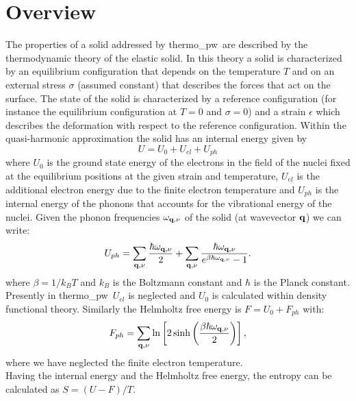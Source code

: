 \documentclass[12pt,a4paper]{article}
\def\tpw{{\sc thermo\_pw}}
\begin{document}
\section{\color{coral}Overview}
The properties of a solid addressed by \tpw\ are described by the thermodynamic
theory of the elastic solid. In this theory a solid is characterized by an
equilibrium configuration that depends on the temperature $T$ and on an
external stress $\sigma$ (assumed constant) that describes the forces 
that act on the surface. The state
of the solid is characterized by a reference configuration 
(for instance the equilibrium configuration at $T=0$ and $\sigma=0$) and 
a strain $\epsilon$ which describes the deformation with respect to the 
reference configuration. 
Within the quasi-harmonic approximation the solid has an internal
energy given by  
\begin{equation}
U=U_0 + U_{el} + U_{ph}
\end{equation}
where $U_0$ is the ground state energy of the electrons in the field 
of the nuclei fixed at the equilibrium positions at the given strain and
temperature, $U_{el}$ is the additional electron energy due to the 
finite electron temperature and $U_{ph}$ is the internal energy of the 
phonons that accounts for the vibrational energy of the nuclei. 
Given the phonon frequencies $\omega_{{\bf q},\nu}$ of the solid 
(at wavevector ${\bf q}$) we can write:
\begin{equation}
U_{ph} = \sum_{{\bf q},\nu} {\hbar \omega_{{\bf q},\nu} \over 2}
+ \sum_{{\bf q},\nu} {\hbar \omega_{{\bf q},\nu} \over 
e^{\beta \hbar \omega_{{\bf q},\nu}}-1}.
\label{uvib}
\end{equation}
where $\beta=1/ k_B T$ and $k_B$ is the Boltzmann constant and $\hbar$ is the
Planck constant.
Presently in \tpw\ $U_{el}$ is neglected and $U_0$ is calculated
within density functional theory.
Similarly the Helmholtz free energy is $F=U_0+F_{ph}$ with:
\begin{equation}
F_{ph} = \sum_{{\bf q},\nu} \ln \left[ 2 \sinh \left({\beta \hbar 
\omega_{{\bf q},\nu} \over 2}\right) \right],
\nonumber
\end{equation}
where we have neglected the finite electron temperature. \\
Having the internal energy and the Helmholtz free energy, the entropy can 
be calculated as $S=(U-F)/T$.
\end{document}
